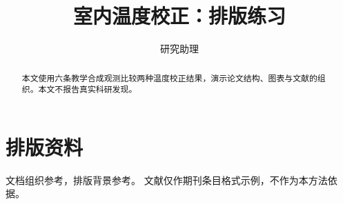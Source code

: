 \documentclass[review]{labpaper}
\title{室内温度校正：排版练习}
\author{研究助理}
\date{}
\begin{document}
\maketitle
\begin{abstract}本文使用六条教学合成观测比较两种温度校正结果，演示论文结构、图表与文献的组织。本文不报告真实科研发现。\end{abstract}



\section{排版资料}
文档组织参考\cite{lamport1994}，排版背景参考\cite{knuth1984}。
文献\cite{einstein1905}仅作期刊条目格式示例，不作为本方法依据。
\printbibliography[title={参考文献}]
\end{document}

